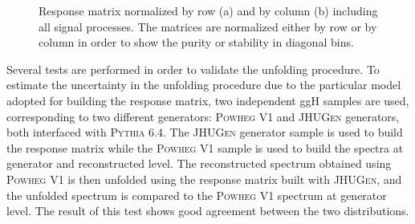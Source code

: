\begin{figure}[htb]
\centering
{}
\caption{Response matrix normalized by row (a) and  by column (b) including all signal processes. The matrices are normalized either by row or by column in order to show the purity or stability in diagonal bins.}\label{fig:matrix}
\end{figure}

Several tests are performed in order to validate the unfolding procedure. To estimate the uncertainty in the unfolding procedure due to the
particular model adopted for building the response matrix, two independent ggH samples are used, corresponding to two different generators: \textsc{Powheg V1} and \textsc{JHUGen} generators, both interfaced with \textsc{Pythia 6.4}.
The \textsc{JHUGen} generator sample is used to build the response matrix while the
\textsc{Powheg V1} sample is used to build the \pth spectra at generator and reconstructed level. The reconstructed spectrum obtained using \textsc{Powheg V1} is then unfolded using the response matrix built with \textsc{JHUGen}, and the unfolded spectrum is compared to the \textsc{Powheg V1} spectrum at generator level. The result of this test shows good agreement between the two distributions.

